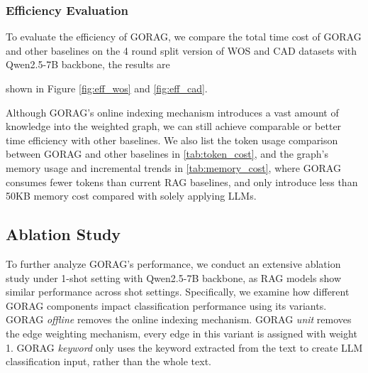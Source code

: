 \begin{table}[t]
	\centering
	\caption{Graph incremental trends and memory usage on IFS-Rel dataset round 1 with GPT-4o LLM.}
	\label{tab:memory_cost}
	\vspace{-10px}
	\vspace{-15px}
\end{table}
\subsubsection{\textbf{Efficiency Evaluation}}\label{sec:efficiency}

To evaluate the efficiency of GORAG, we compare the total time cost of GORAG and other baselines on the 4 round split version of WOS and CAD datasets with Qwen2.5-7B backbone, the results are 

shown in Figure \autoref{fig:eff_wos} and \autoref{fig:eff_cad}. 



Although GORAG's online indexing mechanism introduces a vast amount of knowledge into the weighted graph, we can still achieve comparable or better time efficiency with other baselines. 
We also list the token usage comparison between GORAG and other baselines in \autoref{tab:token_cost}, and the graph's memory usage and incremental trends in \autoref{tab:memory_cost}, where GORAG consumes fewer tokens than current RAG baselines, and only introduce less than 50KB memory cost compared with solely applying LLMs.

\subsection{Ablation Study}\label{ssec:exp:ablation}
{\color{black}To further analyze GORAG's performance, 
we conduct an extensive ablation study under 1-shot setting with Qwen2.5-7B backbone}, as RAG models show similar performance across shot settings. Specifically, we examine how different GORAG components impact classification performance using its variants. GORAG \textit{offline} removes the online indexing mechanism. 
GORAG \textit{unit}  removes the edge weighting mechanism, every edge in this variant is assigned with weight 1. 
GORAG \textit{keyword} only uses the keyword extracted from the text to create LLM classification input, rather than the whole text. 

